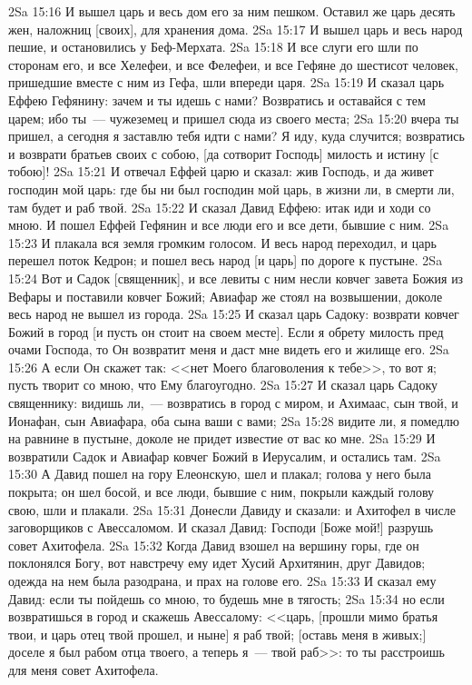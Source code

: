 \vs 2Sa 15:16 И вышел царь и весь дом его за ним пешком. Оставил же царь десять жен, наложниц [своих], для хранения дома.
\vs 2Sa 15:17 И вышел царь и весь народ пешие, и остановились у Беф-Мерхата.
\vs 2Sa 15:18 И все слуги его шли по сторонам его, и все Хелефеи, и все Фелефеи, и все Гефяне до шестисот человек, пришедшие вместе с ним из Гефа, шли впереди царя.
\vs 2Sa 15:19 И сказал царь Еффею Гефянину: зачем и ты идешь с нами? Возвратись и оставайся с тем царем; ибо ты~--- чужеземец и пришел сюда из своего места;
\vs 2Sa 15:20 вчера ты пришел, а сегодня я заставлю тебя идти с нами? Я иду, куда случится; возвратись и возврати братьев своих с собою, [да сотворит Господь] милость и истину [с тобою]!
\vs 2Sa 15:21 И отвечал Еффей царю и сказал: жив Господь, и да живет господин мой царь: где бы ни был господин мой царь, в жизни ли, в смерти ли, там будет и раб твой.
\vs 2Sa 15:22 И сказал Давид Еффею: итак иди и ходи со мною. И пошел Еффей Гефянин и все люди его и все дети, бывшие с ним.
\vs 2Sa 15:23 И плакала вся земля громким голосом. И весь народ переходил, и царь перешел поток Кедрон; и пошел весь народ [и царь] по дороге к пустыне.
\vs 2Sa 15:24 Вот и Садок [священник], и все левиты с ним несли ковчег завета Божия из Вефары и поставили ковчег Божий; Авиафар же стоял на возвышении, доколе весь народ не вышел из города.
\vs 2Sa 15:25 И сказал царь Садоку: возврати ковчег Божий в город [и пусть он стоит на своем месте]. Если я обрету милость пред очами Господа, то Он возвратит меня и даст мне видеть его и жилище его.
\vs 2Sa 15:26 А если Он скажет так: <<нет Моего благоволения к тебе>>, то вот я; пусть творит со мною, что Ему благоугодно.
\vs 2Sa 15:27 И сказал царь Садоку священнику: видишь ли,~--- возвратись в город с миром, и Ахимаас, сын твой, и Ионафан, сын Авиафара, оба сына ваши с вами;
\vs 2Sa 15:28 видите ли, я помедлю на равнине в пустыне, доколе не придет известие от вас ко мне.
\vs 2Sa 15:29 И возвратили Садок и Авиафар ковчег Божий в Иерусалим, и остались там.
\vs 2Sa 15:30 А Давид пошел на гору Елеонскую, шел и плакал; голова у него была покрыта; он шел босой, и все люди, бывшие с ним, покрыли каждый голову свою, шли и плакали.
\vs 2Sa 15:31 Донесли Давиду и сказали: и Ахитофел в числе заговорщиков с Авессаломом. И сказал Давид: Господи [Боже мой!] разрушь совет Ахитофела.
\vs 2Sa 15:32 Когда Давид взошел на вершину горы, где он поклонялся Богу, вот навстречу ему идет Хусий Архитянин, друг Давидов; одежда на нем была разодрана, и прах на голове его.
\vs 2Sa 15:33 И сказал ему Давид: если ты пойдешь со мною, то будешь мне в тягость;
\vs 2Sa 15:34 но если возвратишься в город и скажешь Авессалому: <<царь, [прошли мимо братья твои, и царь отец твой прошел, и ныне] я раб твой; [оставь меня в живых;] доселе я был рабом отца твоего, а теперь я~--- твой раб>>: то ты расстроишь для меня совет Ахитофела.
